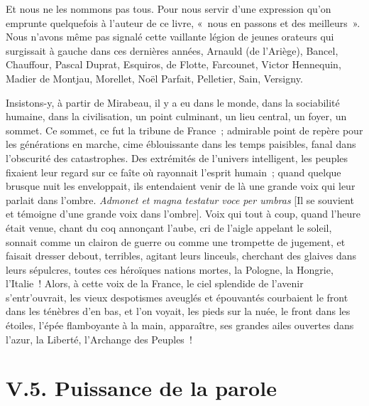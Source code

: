 \documentclass[french,twoside]{book} %
\begin{document}
Et nous ne les nommons pas tous. Pour nous servir d’une expression qu’on emprunte quelquefois à l’auteur de ce livre, « nous en passons et des meilleurs ». Nous n’avons même pas signalé cette vaillante légion de jeunes orateurs qui surgissait à gauche dans ces dernières années, Arnauld (de l’Ariège), Bancel, Chauffour, Pascal Duprat, Esquiros, de Flotte, Farcounet, Victor Hennequin, Madier de Montjau, Morellet, Noël Parfait, Pelletier, Sain, Versigny.\par
Insistons-y, à partir de Mirabeau, il y a eu dans le monde, dans la sociabilité humaine, dans la civilisation, un point culminant, un lieu central, un foyer, un sommet. Ce sommet, ce fut la tribune de France ; admirable point de repère pour les générations en marche, cime éblouissante dans les temps paisibles, fanal dans l’obscurité des catastrophes. Des extrémités de l’univers intelligent, les peuples fixaient leur regard sur ce faîte où rayonnait l’esprit humain ; quand quelque brusque nuit les enveloppait, ils entendaient venir de là une grande voix qui leur parlait dans l’ombre. \emph{Admonet et magna testatur voce per umbras} [Il se souvient et témoigne d’une grande voix dans l’ombre]. Voix qui tout à coup, quand l’heure était venue, chant du coq annonçant l’aube, cri de l’aigle appelant le soleil, sonnait comme un clairon de guerre ou comme une trompette de jugement, et faisait dresser debout, terribles, agitant leurs linceuls, cherchant des glaives dans leurs sépulcres, toutes ces héroïques nations mortes, la Pologne, la Hongrie, l’Italie ! Alors, à cette voix de la France, le ciel splendide de l’avenir s’entr’ouvrait, les vieux despotismes aveuglés et épouvantés courbaient le front dans les ténèbres d’en bas, et l’on voyait, les pieds sur la nuée, le front dans les étoiles, l’épée flamboyante à la main, apparaître, ses grandes ailes ouvertes dans l’azur, la Liberté, l’Archange des Peuples !

\section[{V.5. Puissance de la parole}]{V.5. Puissance de la parole}
\end{document}
